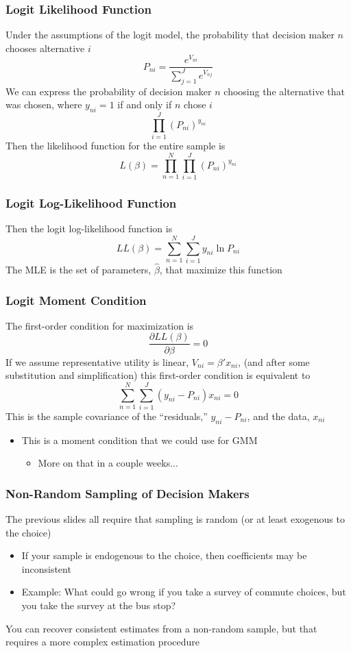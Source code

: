 \documentclass{beamer}\usepackage[]{graphicx}\usepackage[]{color}
\begin{document}
\begin{frame}\frametitle{Logit Likelihood Function}
    Under the assumptions of the logit model, the probability that decision maker $n$ chooses alternative $i$
    $$P_{ni} = \frac{e^{V_{ni}}}{\sum_{j = 1}^J e^{V_{nj}}}$$
    We can express the probability of decision maker $n$ choosing the alternative that was chosen, where $y_{ni} = 1$ if and only if $n$ chose $i$ 
    $$\prod_{i = 1}^J (P_{ni})^{y_{ni}}$$
    Then the likelihood function for the entire sample is
    $$L(\beta) = \prod_{n = 1}^N \prod_{i = 1}^J (P_{ni})^{y_{ni}}$$
\end{frame}

\begin{frame}\frametitle{Logit Log-Likelihood Function}
    Then the logit log-likelihood function is
    $$LL(\beta) = \sum_{n = 1}^N \sum_{i = 1}^J y_{ni} \ln P_{ni}$$
    The MLE is the set of parameters, $\hat{\beta}$, that maximize this function
\end{frame}

\begin{frame}\frametitle{Logit Moment Condition}
    The first-order condition for maximization is
    $$\frac{\partial LL(\beta)}{\partial \beta} = 0$$
    If we assume representative utility is linear, $V_{ni} = \beta' x_{ni}$, (and after some substitution and simplification) this first-order condition is equivalent to
    $$\sum_{n = 1}^N \sum_{i = 1}^J (y_{ni} - P_{ni}) x_{ni} = 0$$
    This is the sample covariance of the ``residuals,'' $y_{ni} - P_{ni}$, and the data, $x_{ni}$
    \begin{itemize}
    	\item This is a moment condition that we could use for GMM
    	\begin{itemize}
    		\item More on that in a couple weeks...
    	\end{itemize}
    \end{itemize}
\end{frame}

\begin{frame}\frametitle{Non-Random Sampling of Decision Makers}
    The previous slides all require that sampling is random (or at least exogenous to the choice)
    \begin{itemize}
    	\item If your sample is endogenous to the choice, then coefficients may be inconsistent
    	\item Example: What could go wrong if you take a survey of commute choices, but you take the survey at the bus stop?
    \end{itemize}
    \vspace{3ex}
    You can recover consistent estimates from a non-random sample, but that requires a more complex estimation procedure
\end{frame}
\end{document}
